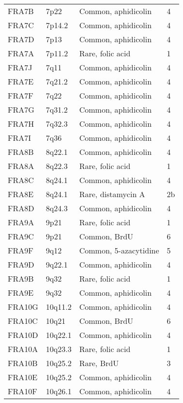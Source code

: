 \documentclass[phd,tocprelim]{cornell}
\begin{document}
\begin{center}
\begin{longtable}{|l|l|l|l|}
     FRA7B  & 7p22     & Common, aphidicolin   & 4 \\
     FRA7C  & 7p14.2   & Common, aphidicolin   & 4 \\
     FRA7D  & 7p13     & Common, aphidicolin   & 4 \\
     FRA7A  & 7p11.2   & Rare, folic acid    & 1 \\
     FRA7J  & 7q11     & Common, aphidicolin   & 4 \\
     FRA7E  & 7q21.2   & Common, aphidicolin   & 4 \\
     FRA7F  & 7q22     & Common, aphidicolin   & 4 \\
     FRA7G  & 7q31.2   & Common, aphidicolin   & 4 \\
     FRA7H  & 7q32.3   & Common, aphidicolin   & 4 \\
     FRA7I  & 7q36     & Common, aphidicolin   & 4 \\
     FRA8B  & 8q22.1   & Common, aphidicolin   & 4 \\
     FRA8A  & 8q22.3   & Rare, folic acid    & 1 \\
     FRA8C  & 8q24.1   & Common, aphidicolin   & 4 \\
     FRA8E  & 8q24.1   & Rare, distamycin A  & 2b \\
     FRA8D  & 8q24.3   & Common, aphidicolin   & 4 \\
     FRA9A  & 9p21     & Rare, folic acid    & 1 \\
     FRA9C  & 9p21     & Common, BrdU          & 6 \\
     FRA9F  & 9q12     & Common, 5-azacytidine & 5 \\
     FRA9D  & 9q22.1   & Common, aphidicolin   & 4 \\
     FRA9B  & 9q32     & Rare, folic acid    & 1 \\
     FRA9E  & 9q32     & Common, aphidicolin   & 4 \\
     FRA10G & 10q11.2  & Common, aphidicolin   & 4 \\
     FRA10C & 10q21    & Common, BrdU          & 6 \\
     FRA10D & 10q22.1  & Common, aphidicolin   & 4 \\
     FRA10A & 10q23.3  & Rare, folic acid    & 1 \\
     FRA10B & 10q25.2  & Rare, BrdU          & 3 \\
     FRA10E & 10q25.2  & Common, aphidicolin   & 4 \\
     FRA10F & 10q26.1  & Common, aphidicolin   & 4 \\

\end{longtable}
\end{center}
\end{document}
